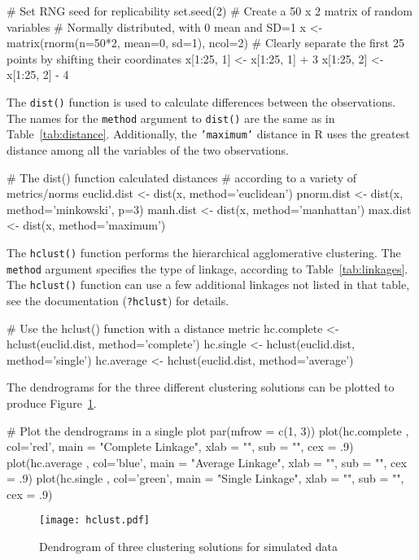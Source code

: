 \begin{Rcode}
# Set RNG seed for replicability
set.seed(2)
# Create a 50 x 2 matrix of random variables 
# Normally distributed, with 0 mean and SD=1
x <- matrix(rnorm(n=50*2, mean=0, sd=1), ncol=2)
# Clearly separate the first 25 points by shifting their coordinates
x[1:25, 1] <- x[1:25, 1] + 3
x[1:25, 2] <- x[1:25, 2] - 4
\end{Rcode}

The \texttt{dist()} function is used to calculate differences between the observations. The names for the \texttt{method} argument to \texttt{dist()} are the same as in Table~\ref{tab:distance}. Additionally, the \texttt{'maximum'} distance in R uses the greatest distance among all the variables of the two observations. 

\begin{Rcode}
# The dist() function calculated distances
# according to a variety of metrics/norms
euclid.dist <- dist(x, method='euclidean')
pnorm.dist <- dist(x, method='minkowski', p=3)
manh.dist <- dist(x, method='manhattan')
max.dist <- dist(x, method='maximum')
\end{Rcode}

The \texttt{hclust()} function performs the hierarchical agglomerative clustering. The \texttt{method} argument specifies the type of linkage, according to Table~\ref{tab:linkages}. The \texttt{hclust()} function can use a few additional linkages not listed in that table, see the documentation (\texttt{?hclust}) for details. 

\begin{Rcode}
# Use the hclust() function with a distance metric
hc.complete <- hclust(euclid.dist, method='complete')
hc.single <- hclust(euclid.dist, method='single')
hc.average <- hclust(euclid.dist, method='average')
\end{Rcode}

The dendrograms for the three different clustering solutions can be plotted to produce Figure~\ref{fig:dendro4}. 

\begin{Rcode}
# Plot the dendrograms in a single plot
par(mfrow = c(1, 3))
plot(hc.complete , col='red', 
   main = "Complete Linkage", xlab = "", sub = "", cex = .9)
plot(hc.average , col='blue', 
   main = "Average Linkage", xlab = "", sub = "", cex = .9)
plot(hc.single , col='green', 
   main = "Single Linkage", xlab = "", sub = "", cex = .9)
\end{Rcode}

\begin{figure}
\centering
\texttt{[image: hclust.pdf]}
\caption{Dendrogram of three clustering solutions for simulated data}
\label{fig:dendro4}
\end{figure}

